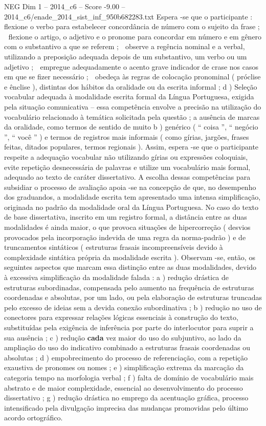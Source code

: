 \begin{textsample}{NEG Dim 1 – 2014\_c6 – Score -9.00 – 2014\_c6/enade\_2014\_sist\_inf\_950b682283.txt}
Espera -se que o participante :  flexione o verbo para estabelecer concordância de número com o sujeito da frase ;  flexione o artigo, o adjetivo e o pronome para concordar em número e em gênero com o substantivo a que se referem ;  observe a regência nominal e a verbal, utilizando a preposição adequada depois de um substantivo, um verbo ou um adjetivo ;  empregue adequadamente o acento grave indicador de crase nos casos em que se fizer necessário ;  obedeça às regras de colocação pronominal ( próclise e ênclise ), distintas dos hábitos da oralidade ou da escrita informal ; d ) Seleção vocabular adequada à modalidade escrita formal da Língua Portuguesa, exigida pela situação comunicativa – essa competência envolve a precisão na utilização do vocabulário relacionado à temática solicitada pela questão ; a ausência de marcas da oralidade, como termos de sentido de muito b ) genérico ( “ coisa ”, “ negócio ”, “ você ” ) e termos de registros mais informais ( como gírias, jargões, frases feitas, ditados populares, termos regionais ).
Assim, espera -se que o participante respeite a adequação vocabular não utilizando gírias ou expressões coloquiais, evite repetição desnecessária de palavras e utilize um vocabulário mais formal, adequado ao texto de caráter dissertativo.
A escolha dessas competências para subsidiar o processo de avaliação apoia -se na concepção de que, no desempenho dos graduandos, a modalidade escrita tem apresentado uma intensa simplificação, originada no padrão da modalidade oral da Língua Portuguesa.
No caso do texto de base dissertativa, inscrito em um registro formal, a distância entre as duas modalidades é ainda maior, o que provoca situações de hipercorreção ( desvios provocados pela incorporação indevida de uma regra da norma-padrão ) e de truncamentos sintáticos ( estruturas frasais incompreensíveis devido à complexidade sintática própria da modalidade escrita ).
Observam -se, então, os seguintes aspectos que marcam essa distinção entre as duas modalidades, devido à excessiva simplificação da modalidade falada : a ) redução drástica de estruturas subordinadas, compensada pelo aumento na frequência de estruturas coordenadas e absolutas, por um lado, ou pela elaboração de estruturas truncadas pelo excesso de ideias sem a devida conexão subordinativa ; b ) redução no uso de conectores para expressar relações lógicas essenciais à construção do texto, substituídas pela exigência de inferência por parte do interlocutor para suprir a sua ausência ; c ) redução \textbf{cada} vez maior do uso do subjuntivo, ao lado da ampliação do uso do indicativo combinado a estruturas frasais coordenadas ou absolutas ; d ) empobrecimento do processo de referenciação, com a repetição exaustiva de pronomes ou nomes ; e ) simplificação extrema da marcação da categoria tempo na morfologia verbal ; f ) falta de domínio de vocabulário mais abstrato e de maior complexidade, essencial ao desenvolvimento do processo dissertativo ; g ) redução drástica no emprego da acentuação gráfica, processo intensificado pela divulgação imprecisa das mudanças promovidas pelo último acordo ortográfico.

\end{textsample}
